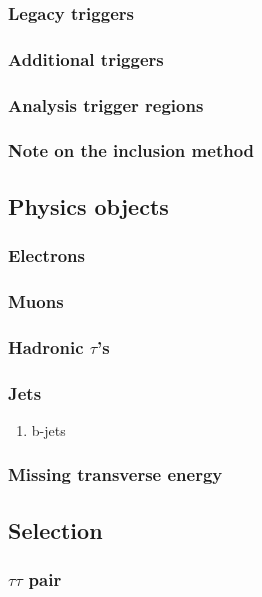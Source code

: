 \documentclass[11pt]{article}
\begin{document}
\subsubsection{Legacy triggers}
\label{sec:orgf3119a6}
\subsubsection{Additional triggers}
\label{sec:org3a269aa}
\subsubsection{Analysis trigger regions}
\label{sec:org8dab270}
\subsubsection{Note on the inclusion method}
\label{sec:orgd299413}
\subsection{Physics objects}
\label{sec:orga3a062a}
\subsubsection{Electrons}
\label{sec:orgce40bd4}
\subsubsection{Muons}
\label{sec:org0e25526}
\subsubsection{Hadronic \(\tau\)'s}
\label{sec:orgf08de1b}
\subsubsection{Jets}
\label{sec:orgfb694e7}
\begin{enumerate}
\item b-jets
\label{sec:orga5012a6}
\end{enumerate}
\subsubsection{Missing transverse energy}
\label{sec:org045c518}
\subsection{Selection}
\label{sec:org2a83fda}
\subsubsection{\(\tau \tau\) pair}
\label{sec:org8069808}
\end{document}
